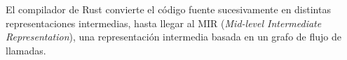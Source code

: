 \documentclass[12pt, a4paper]{article}
\begin{document}
El compilador de Rust convierte el código fuente sucesivamente en distintas representaciones intermedias, hasta llegar al MIR (\textit{Mid-level Intermediate Representation}), una representación intermedia basada en un grafo de flujo de llamadas.











\end{document}
